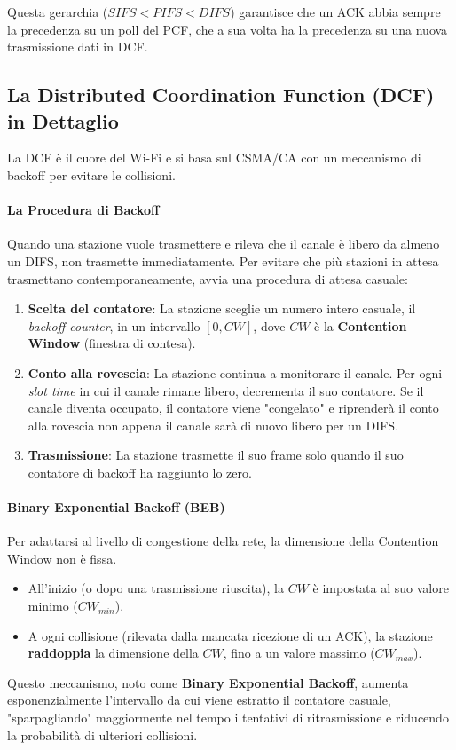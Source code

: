 Questa gerarchia ($SIFS < PIFS < DIFS$) garantisce che un ACK abbia sempre la precedenza su un poll del PCF, che a sua volta ha la precedenza su una nuova trasmissione dati in DCF.


\subsection{La Distributed Coordination Function (DCF) in Dettaglio}
La DCF è il cuore del Wi-Fi e si basa sul CSMA/CA con un meccanismo di backoff per evitare le collisioni.

\paragraph{La Procedura di Backoff}
Quando una stazione vuole trasmettere e rileva che il canale è libero da almeno un DIFS, non trasmette immediatamente. Per evitare che più stazioni in attesa trasmettano contemporaneamente, avvia una procedura di attesa casuale:
\begin{enumerate}
    \item \textbf{Scelta del contatore}: La stazione sceglie un numero intero casuale, il \textit{backoff counter}, in un intervallo $[0, CW]$, dove $CW$ è la \textbf{Contention Window} (finestra di contesa).
    \item \textbf{Conto alla rovescia}: La stazione continua a monitorare il canale. Per ogni \textit{slot time} in cui il canale rimane libero, decrementa il suo contatore. Se il canale diventa occupato, il contatore viene "congelato" e riprenderà il conto alla rovescia non appena il canale sarà di nuovo libero per un DIFS.
    \item \textbf{Trasmissione}: La stazione trasmette il suo frame solo quando il suo contatore di backoff ha raggiunto lo zero.
\end{enumerate}

\paragraph{Binary Exponential Backoff (BEB)}
Per adattarsi al livello di congestione della rete, la dimensione della Contention Window non è fissa.
\begin{itemize}
    \item All'inizio (o dopo una trasmissione riuscita), la $CW$ è impostata al suo valore minimo ($CW_{min}$).
    \item A ogni collisione (rilevata dalla mancata ricezione di un ACK), la stazione \textbf{raddoppia} la dimensione della $CW$, fino a un valore massimo ($CW_{max}$).
\end{itemize}

Questo meccanismo, noto come \textbf{Binary Exponential Backoff}, aumenta esponenzialmente l'intervallo da cui viene estratto il contatore casuale, "sparpagliando" maggiormente nel tempo i tentativi di ritrasmissione e riducendo la probabilità di ulteriori collisioni.

